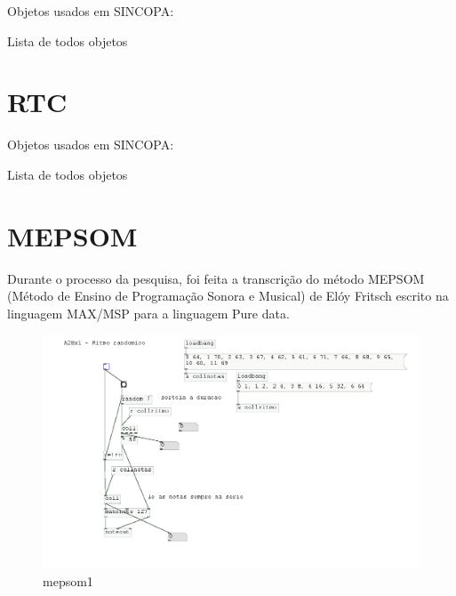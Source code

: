 \documentclass[draft]{ppgmus}
\begin{document}
Objetos usados em SINCOPA:



Lista de todos objetos


\section{RTC}
\label{rtc}

Objetos usados em SINCOPA:


Lista de todos objetos


\section{MEPSOM}
\label{mepsom}

Durante o processo da pesquisa, foi feita a transcrição do método MEPSOM (Método de Ensino
de Programação Sonora e Musical) de Elóy Fritsch escrito na linguagem MAX/MSP para a linguagem
Pure data.


\begin{figure}
\includegraphics[scale=.4]{mepsom1}
\caption{mepsom1}
\label{mepsom1}
\end{figure}
\end{document}
